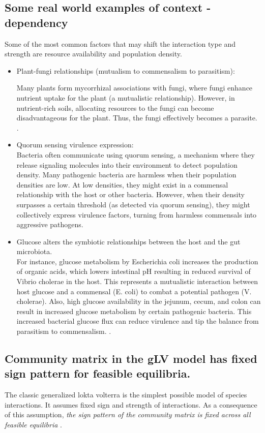 \subsection{Some real world examples of context - dependency}
Some of the most common factors that may shift the interaction type and strength are resource availability and population density.
\begin{itemize}
    \item Plant-fungi relationships (mutualism to commensalism to parasitism):

Many plants form mycorrhizal associations with fungi, where fungi enhance nutrient uptake for the plant (a mutualistic relationship). However, in nutrient-rich soils, allocating resources to the fungi can become disadvantageous for the plant. Thus, the fungi effectively becomes a parasite. \parencite{mycorrhizal}.

    \item Quorum sensing virulence expression:\\
    Bacteria often communicate using quorum sensing, a mechanism where they release signaling molecules into their environment to detect population density.  Many pathogenic bacteria are harmless when their population densities are low. At low densities, they might exist in a commensal relationship with the host or other bacteria. However, when their density surpasses a certain threshold (as detected via quorum sensing), they might collectively express virulence factors, turning from harmless commensals into aggressive pathogens.
    \item 
    Glucose alters the symbiotic relationships between the host and the gut microbiota. \\ For instance, glucose metabolism by Escherichia coli increases the production of organic acids,
    which lowers intestinal pH resulting in reduced survival of Vibrio cholerae in the
    host. This represents a mutualistic interaction between host glucose and a commensal
    (E. coli) to combat a potential pathogen (V.
    cholerae). Also, high glucose availability in the
    jejunum, cecum, and colon can result in
    increased glucose metabolism by certain
    pathogenic bacteria. This increased bacterial
    glucose ﬂux can reduce virulence and tip the
    balance from parasitism to commensalism. 
    \parencite{doi:10.1152/ajpendo.00485.2019}.
\end{itemize}



\subsection{Community matrix in the gLV model has fixed sign pattern for feasible equilibria.}
The classic generalized lokta volterra is the simplest possible model of species interactions. It assumes fixed sign and strength of interactions. As a consequence of this assumption, \textit{the sign pattern of the community matrix is fixed across all feasible equilibria} \parencite{Allesina_Brasil}.

